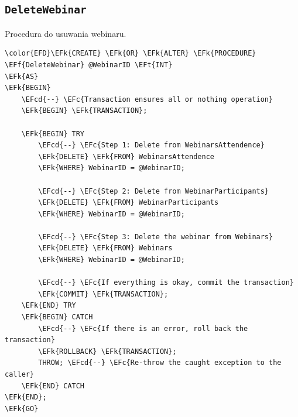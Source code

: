 \documentclass[11pt]{article}
\newcommand{\EFc}[1]{\textcolor{EFc}{\textit{#1}}} %
\newcommand{\EFcd}[1]{\textcolor{EFcd}{\textit{#1}}} %
\newcommand{\EFk}[1]{\textcolor{EFk}{\textbf{#1}}} %
\newcommand{\EFf}[1]{\textcolor{EFf}{#1}} %
\newcommand{\EFt}[1]{\textcolor{EFt}{\textbf{#1}}} %
\begin{document}
\subsection{\texttt{DeleteWebinar}}
\label{sec:org55dba6b}
Procedura do usuwania webinaru.
\begin{Code}
\begin{Verbatim}
\color{EFD}\EFk{CREATE} \EFk{OR} \EFk{ALTER} \EFk{PROCEDURE} \EFf{DeleteWebinar} @WebinarID \EFt{INT}
\EFk{AS}
\EFk{BEGIN}
    \EFcd{--} \EFc{Transaction ensures all or nothing operation}
    \EFk{BEGIN} \EFk{TRANSACTION};

    \EFk{BEGIN} TRY
        \EFcd{--} \EFc{Step 1: Delete from WebinarsAttendence}
        \EFk{DELETE} \EFk{FROM} WebinarsAttendence
        \EFk{WHERE} WebinarID = @WebinarID;

        \EFcd{--} \EFc{Step 2: Delete from WebinarParticipants}
        \EFk{DELETE} \EFk{FROM} WebinarParticipants
        \EFk{WHERE} WebinarID = @WebinarID;

        \EFcd{--} \EFc{Step 3: Delete the webinar from Webinars}
        \EFk{DELETE} \EFk{FROM} Webinars
        \EFk{WHERE} WebinarID = @WebinarID;

        \EFcd{--} \EFc{If everything is okay, commit the transaction}
        \EFk{COMMIT} \EFk{TRANSACTION};
    \EFk{END} TRY
    \EFk{BEGIN} CATCH
        \EFcd{--} \EFc{If there is an error, roll back the transaction}
        \EFk{ROLLBACK} \EFk{TRANSACTION};
        THROW; \EFcd{--} \EFc{Re-throw the caught exception to the caller}
    \EFk{END} CATCH
\EFk{END};
\EFk{GO}
\end{Verbatim}
\end{Code}
\end{document}
